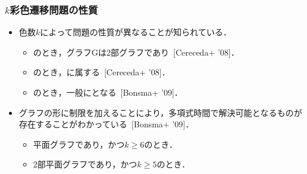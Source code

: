 \begin{frame}\frametitle{$k$彩色遷移問題の性質}

  \begin{itemize}
    \item 色数$k$によって問題の性質が異なることが知られている．
    \begin{itemize}
      \item {}のとき，グラフGは2部グラフであり~[Cereceda+ '08]．
      \item {}のとき，に属する~[Cereceda+ '08]．
      \item {}のとき，一般にとなる~[Bonsma+ '09]．
    \end{itemize}

    \item グラフの形に制限を加えることにより，多項式時間で解決可能となるものが存在することがわかっている~[Bonsma+ '09]．
    \begin{itemize}
      \item 平面グラフであり，かつ$k \ge 6$のとき．
      \item 2部平面グラフであり，かつ$k \ge 5$のとき．
    \end{itemize}

  \end{itemize}

\end{frame}

\begin{comment}

\begin{frame}{クラスPSPACE}
  \begin{itemize}
    \item 計算量のクラスの一つ.
    \item 決定性チューリングマシンに多項式量のメモリを与えることで解決できる問題が属する.
    \item 指数時間で解くことが可能．
    \item P$\subseteq$NP$\subseteq$PSPACEであることはわかっている.
    \begin{itemize}
      \item ただし, 真に包含するかは未解決.
    \end{itemize}
  \end{itemize}
\end{frame}
\end{comment}

